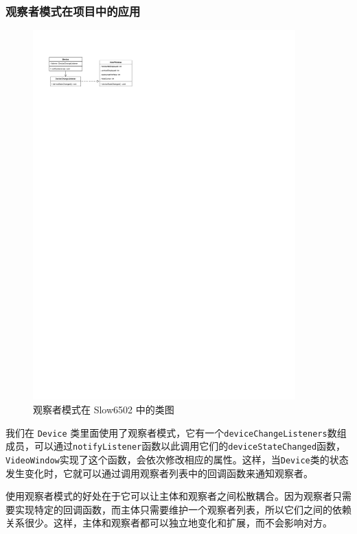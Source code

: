 \subsubsection{观察者模式在项目中的应用}

\begin{figure}[h]
  \centering
  \includegraphics[width=0.9\textwidth]{figures/Observer.pdf}
  \caption{观察者模式在 Slow6502 中的类图}
\end{figure}


我们在 \lstinline{Device} 类里面使用了观察者模式，它有一个\lstinline{deviceChangeListeners}数组成员，可以通过\lstinline{notifyListener}函数以此调用它们的\lstinline{deviceStateChanged}函数，\lstinline{VideoWindow}实现了这个函数，会依次修改相应的属性。这样，当\lstinline{Device}类的状态发生变化时，它就可以通过调用观察者列表中的回调函数来通知观察者。

使用观察者模式的好处在于它可以让主体和观察者之间松散耦合。因为观察者只需要实现特定的回调函数，而主体只需要维护一个观察者列表，所以它们之间的依赖关系很少。这样，主体和观察者都可以独立地变化和扩展，而不会影响对方。